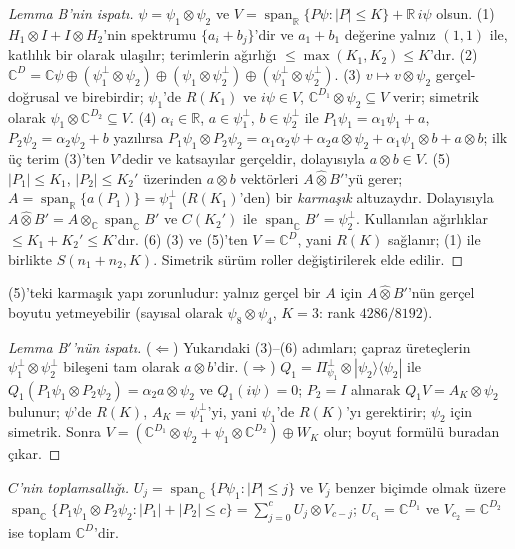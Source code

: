 \documentclass[aps,pra,onecolumn,superscriptaddress,nofootinbib,longbibliography,10pt]{revtex4-2}
\theoremstyle{definition}
\newcommand{\CC}{\mathbb C}
\newcommand{\RR}{\mathbb R}
\newcommand{\spanR}{\operatorname{span}_{\RR}}
\newcommand{\spanC}{\operatorname{span}_{\CC}}
\begin{document}
\begin{proof}[Lemma B'nin ispatı]
$\psi=\psi_1\otimes\psi_2$ ve $V=\spanR\{P\psi:|P|\le K\}+\RR\,i\psi$ olsun.
(1) $H_1\otimes I+I\otimes H_2$'nin spektrumu $\{a_i+b_j\}$'dir ve $a_1+b_1$ değerine yalnız $(1{,}1)$ ile, katlılık bir olarak ulaşılır; terimlerin ağırlığı $\le\max(K_1,K_2)\le K$'dır.
(2) $\CC^D=\CC\psi\oplus(\psi_1^\perp\otimes\psi_2)\oplus(\psi_1\otimes\psi_2^\perp)\oplus(\psi_1^\perp\otimes\psi_2^\perp)$.
(3) $v\mapsto v\otimes\psi_2$ gerçel-doğrusal ve birebirdir; $\psi_1$'de $R(K_1)$ ve $i\psi\in V$, $\CC^{D_1}\otimes\psi_2\subseteq V$ verir; simetrik olarak $\psi_1\otimes\CC^{D_2}\subseteq V$.
(4) $\alpha_i\in\RR$, $a\in\psi_1^\perp$, $b\in\psi_2^\perp$ ile $P_1\psi_1=\alpha_1\psi_1+a$, $P_2\psi_2=\alpha_2\psi_2+b$ yazılırsa
$P_1\psi_1\otimes P_2\psi_2=\alpha_1\alpha_2\psi+\alpha_2a\otimes\psi_2+\alpha_1\psi_1\otimes b+a\otimes b$; ilk üç terim (3)'ten $V$'dedir ve katsayılar gerçeldir, dolayısıyla $a\otimes b\in V$.
(5) $|P_1|\le K_1$, $|P_2|\le K_2'$ üzerinden $a\otimes b$ vektörleri $A\hat\otimes B'$'yü gerer; $A=\spanR\{a(P_1)\}=\psi_1^\perp$ ($R(K_1)$'den) bir \emph{karmaşık} altuzaydır. Dolayısıyla $A\hat\otimes B'=A\otimes_{\CC}\spanC B'$ ve $C(K_2')$ ile $\spanC B'=\psi_2^\perp$. Kullanılan ağırlıklar $\le K_1+K_2'\le K$'dır.
(6) (3) ve (5)'ten $V=\CC^D$, yani $R(K)$ sağlanır; (1) ile birlikte $S(n_1+n_2,K)$. Simetrik sürüm roller değiştirilerek elde edilir.
\end{proof}
\noindent (5)'teki karmaşık yapı zorunludur: yalnız gerçel bir $A$ için $A\hat\otimes B'$'nün gerçel boyutu yetmeyebilir (sayısal olarak $\psi_8\otimes\psi_4$, $K=3$: rank $4286/8192$).

\begin{proof}[Lemma B$'$'nün ispatı]
($\Leftarrow$) Yukarıdaki (3)--(6) adımları; çapraz üreteçlerin $\psi_1^\perp\otimes\psi_2^\perp$ bileşeni tam olarak $a\otimes b$'dir. ($\Rightarrow$) $Q_1=\Pi^\perp_{\psi_1}\otimes|\psi_2\rangle\langle\psi_2|$ ile $Q_1(P_1\psi_1\otimes P_2\psi_2)=\alpha_2a\otimes\psi_2$ ve $Q_1(i\psi)=0$; $P_2=I$ alınarak $Q_1V=A_K\otimes\psi_2$ bulunur; $\psi$'de $R(K)$, $A_K=\psi_1^\perp$'yi, yani $\psi_1$'de $R(K)$'yı gerektirir; $\psi_2$ için simetrik. Sonra $V=(\CC^{D_1}\otimes\psi_2+\psi_1\otimes\CC^{D_2})\oplus W_K$ olur; boyut formülü buradan çıkar.
\end{proof}
\noindent \emph{$C$'nin toplamsallığı.} $U_j=\spanC\{P\psi_1:|P|\le j\}$ ve $V_j$ benzer biçimde olmak üzere $\spanC\{P_1\psi_1\otimes P_2\psi_2:|P_1|+|P_2|\le c\}=\sum_{j=0}^{c}U_j\otimes V_{c-j}$; $U_{c_1}=\CC^{D_1}$ ve $V_{c_2}=\CC^{D_2}$ ise toplam $\CC^D$'dir.
\end{document}

